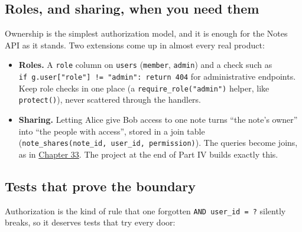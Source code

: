 \subsection*{Roles, and sharing, when you need them}\label{38-security:roles-and-sharing-when-you-need-them}

Ownership is the simplest authorization model, and it is enough for the Notes API as it stands. Two extensions come up in almost every real product:

\begin{itemize}
\tightlist
\item
  \textbf{Roles.} A \texttt{role} column on \texttt{users} (\texttt{\textquotesingle{}member\textquotesingle{}}, \texttt{\textquotesingle{}admin\textquotesingle{}}) and a check such as \texttt{if\ g.}\allowbreak{}\texttt{user{[}"role"{]}\ !=}\allowbreak{}\texttt{\ "admin":}\allowbreak{}\texttt{\ return\ 404} for administrative endpoints. Keep role checks in one place (a \texttt{require\_role("admin")} helper, like \texttt{protect()}), never scattered through the handlers.
\item
  \textbf{Sharing.} Letting Alice give Bob access to one note turns ``the note's owner'' into ``the people with access'', stored in a join table (\texttt{note\_}\allowbreak{}\texttt{shares(note\_}\allowbreak{}\texttt{id,}\allowbreak{}\texttt{\ user\_}\allowbreak{}\texttt{id,}\allowbreak{}\texttt{\ permission)}). The queries become joins, as in \hyperref[ch:33-logic-execution]{Chapter 33}. The project at the end of Part IV builds exactly this.
\end{itemize}

\subsection*{Tests that prove the boundary}\label{38-security:tests-that-prove-the-boundary}

Authorization is the kind of rule that one forgotten \texttt{AND\ user\_id\ =\ ?} silently breaks, so it deserves tests that try every door:

